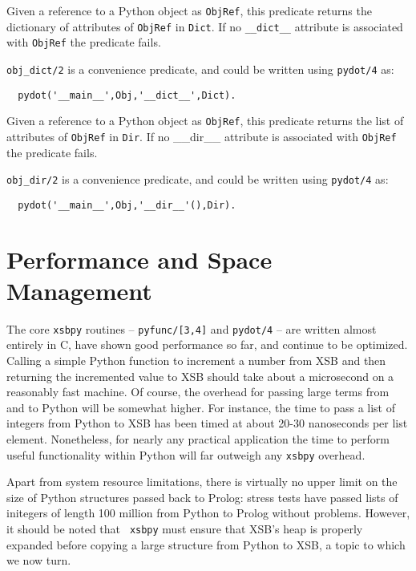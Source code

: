 \begin{description}
%
Given a reference to a Python object as {\tt ObjRef}, this predicate
returns the dictionary of attributes of {\tt ObjRef} in {\tt Dict}.
If no {\tt \_\_dict\_\_} attribute is associated with {\tt ObjRef} the
predicate fails.

{\tt obj\_dict/2} is a convenience predicate, and could be written
using {\tt pydot/4} as:

\begin{verbatim}
  pydot('__main__',Obj,'__dict__',Dict).
\end{verbatim}

%
Given a reference to a Python object as {\tt ObjRef}, this predicate
returns the list of attributes of {\tt ObjRef} in {\tt Dir}.  If no
\_\_dir\_\_ attribute is associated with {\tt ObjRef} the predicate
fails.

{\tt obj\_dir/2} is a convenience predicate, and could be written
using {\tt pydot/4} as:

\begin{verbatim}
  pydot('__main__',Obj,'__dir__'(),Dir).
\end{verbatim}

\end{description}

\section{Performance and Space Management} \label{sec:xsbpy-perf}

The core {\tt xsbpy} routines -- {\tt pyfunc/[3,4]} and {\tt pydot/4}
-- are written almost entirely in C, have shown good performance so
far, and continue to be optimized.  Calling a simple Python function
to increment a number from XSB and then returning the incremented
value to XSB should take about a microsecond on a reasonably fast
machine.  Of course, the overhead for passing large terms from and to
Python will be somewhat higher.  For instance, the time to pass a list
of integers from Python to XSB has been timed at about 20-30
nanoseconds per list element.  Nonetheless, for nearly any practical
application the time to perform useful functionality within Python
will far outweigh any {\tt xsbpy} overhead.

Apart from system resource limitations, there is virtually no upper
limit on the size of Python structures passed back to Prolog: stress
tests have passed lists of initegers of length 100 million from Python
to Prolog without problems. However, it should be noted that {\tt
  xsbpy} must ensure that XSB's heap is properly expanded before
copying a large structure from Python to XSB, a topic to which we now
turn.

